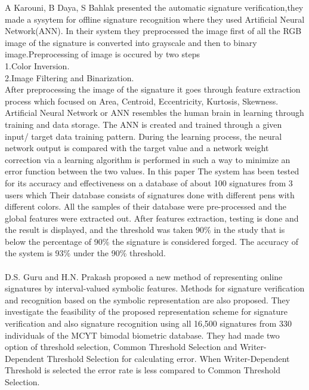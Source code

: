 \documentclass[]{article}
\begin{document}
	A Karouni, B Daya, S Bahlak\cite{bib2} presented the automatic signature verification,they made a sysytem for offline signature recognition where they used Artificial Neural Network(ANN). In their system they preprocessed the image first of all the RGB image of the signature is converted into grayscale and then to
	binary image.Preprocessing of image is occured by two steps\\
	1.Color Inversion.\\
	2.Image Filtering and Binarization.\\
	After preprocessing the image of the signature it goes through feature extraction process which focused on Area, Centroid, Eccentricity, Kurtosis, Skewness.
	Artificial Neural Network or ANN resembles the human brain in learning through training and data storage. The ANN is created and trained through a given input/
	target data training pattern. During the learning process, the neural network output is compared with the target value and a network weight correction via a	learning algorithm is performed in such a way to	minimize an error function between the two values. In this paper The system has been tested for its accuracy and effectiveness on a database of about 100 signatures from 3 users	which Their database consists of
	signatures done with different pens with different colors.
	All the samples of their database were pre-processed and the global features were extracted out. After features extraction, testing is done and the result is displayed, and the threshold was taken 90\% in the study that is below the percentage of 90\% the signature is considered forged.  The accuracy of the system is 93\% under the 90\% threshold.\\\\

	D.S. Guru and H.N. Prakash\cite{bib3} proposed  a new method of representing online signatures by interval-valued symbolic features. Methods for signature verification and recognition based on the symbolic representation are also proposed. They investigate the feasibility of the proposed representation scheme for signature verification and also signature recognition using all 16,500 signatures	from 330 individuals of the MCYT bimodal biometric database. They had made two option of threshold selection, Common Threshold Selection and Writer-Dependent Threshold Selection for calculating error. When Writer-Dependent Threshold is selected the error rate is less compared to Common Threshold Selection.\\\\
	
\end{document}

